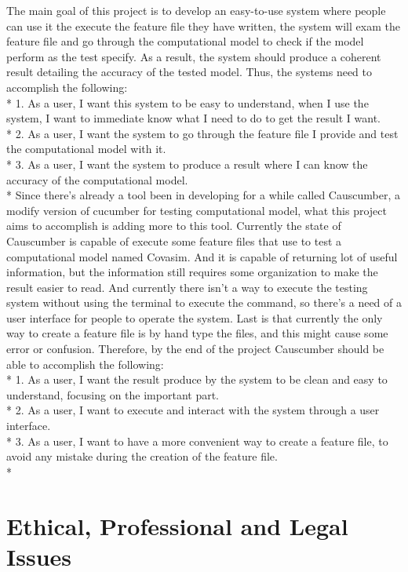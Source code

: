 The main goal of this project is to develop an easy-to-use system where people can use it the execute the feature file they have written, the system will exam the feature file and go through the computational model to check if the model perform as the test specify. As a result, the system should produce a coherent result detailing the accuracy of the tested model. Thus, the systems need to accomplish the following:\\*
1.	As a user, I want this system to be easy to understand, when I use the system, I want to immediate know what I need to do to get the result I want.\\*
2.	As a user, I want the system to go through the feature file I provide and test the computational model with it.\\*
3.	As a user, I want the system to produce a result where I can know the accuracy of the computational model.\\*
Since there’s already a tool been in developing for a while called Causcumber, a modify version of cucumber for testing computational model, what this project aims to accomplish is adding more to this tool. Currently the state of Causcumber is capable of execute some feature files that use to test a computational model named Covasim. And it is capable of returning lot of useful information, but the information still requires some organization to make the result easier to read. And currently there isn’t a way to execute the testing system without using the terminal to execute the command, so there’s a need of a user interface for people to operate the system. Last is that currently the only way to create a feature file is by hand type the files, and this might cause some error or confusion. Therefore, by the end of the project Causcumber should be able to accomplish the following:\\*
1.	As a user, I want the result produce by the system to be clean and easy to understand, focusing on the important part.\\*
2.	As a user, I want to execute and interact with the system through a user interface.\\*
3.	As a user, I want to have a more convenient way to create a feature file, to avoid any mistake during the creation of the feature file.\\*


\section{Ethical, Professional and Legal Issues}

